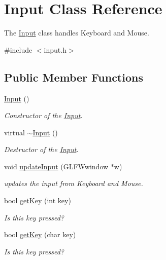 \hypertarget{class_input}{}\section{Input Class Reference}
\label{class_input}


The \hyperlink{class_input}{Input} class handles Keyboard and Mouse.  




{\ttfamily \#include $<$input.\+h$>$}

\subsection*{Public Member Functions}
\begin{DoxyCompactItemize}
\item 
\hyperlink{class_input_abae3f379d3f157cf42dc857309832dba}{Input} ()
\begin{DoxyCompactList}\small\item\em Constructor of the \hyperlink{class_input}{Input}. \end{DoxyCompactList}\item 
\mbox{\label{class_input_af2db35ba67c8a8ccd23bef6a482fc291}} 
virtual \hyperlink{class_input_af2db35ba67c8a8ccd23bef6a482fc291}{$\sim$\+Input} ()
\begin{DoxyCompactList}\small\item\em Destructor of the \hyperlink{class_input}{Input}. \end{DoxyCompactList}\item 
void \hyperlink{class_input_a6fcfdeb17f2db772a1058274a8fac43e}{update\+Input} (G\+L\+F\+Wwindow $\ast$w)
\begin{DoxyCompactList}\small\item\em updates the input from Keyboard and Mouse. \end{DoxyCompactList}\item 
bool \hyperlink{class_input_a62ca94f9d79e246423a8a6e46d6e88dc}{get\+Key} (int key)
\begin{DoxyCompactList}\small\item\em Is this key pressed? \end{DoxyCompactList}\item 
bool \hyperlink{class_input_a9759385ef5234448861d0330a205c40b}{get\+Key} (char key)
\begin{DoxyCompactList}\small\item\em Is this key pressed? \end{DoxyCompactList}\item 

\end{DoxyCompactItemize}
